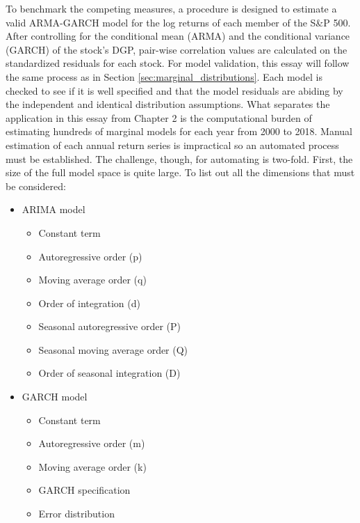 To benchmark the competing measures, a procedure is designed to estimate a valid ARMA-GARCH model for the log returns of each member of the S\&P 500. After controlling for the conditional mean (ARMA) and the conditional variance (GARCH) of the stock's DGP, pair-wise correlation values are calculated on the standardized residuals for each stock. For model validation, this essay will follow the same process as in Section \ref{sec:marginal_distributions}. Each model is checked to see if it is well specified and that the model residuals are abiding by the independent and identical distribution assumptions. What separates the application in this essay from Chapter 2 is the computational burden of estimating hundreds of marginal models for each year from 2000 to 2018. Manual estimation of each annual return series is impractical so an automated process must be established. The challenge, though, for automating is two-fold. First, the size of the full model space is quite large. To list out all the dimensions that must be considered:

\begin{itemize}
    \item ARIMA model
        \begin{itemize}
            \item Constant term
            \item Autoregressive order (p)
            \item Moving average order (q)
            \item Order of integration (d)
            \item Seasonal autoregressive order (P)
            \item Seasonal moving average order (Q)
            \item Order of seasonal integration (D)
        \end{itemize}
        \item GARCH model
        \begin{itemize}
            \item Constant term
            \item Autoregressive order (m)
            \item Moving average order (k)
            \item GARCH specification
            \item Error distribution
        \end{itemize}
\end{itemize}

